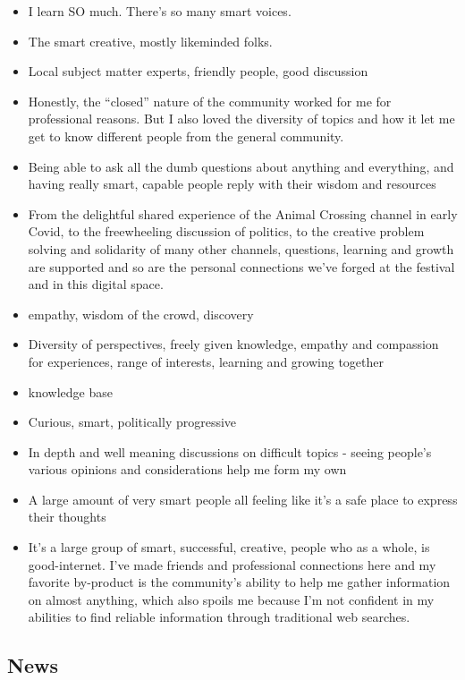 \documentclass[
]{book}
\providecommand{\tightlist}{%
  \setlength{\itemsep}{0pt}\setlength{\parskip}{0pt}}
\begin{document}
\begin{itemize}
\tightlist
\item
  I learn SO much. There's so many smart voices.
\item
  The smart creative, mostly likeminded folks.
\item
  Local subject matter experts, friendly people, good discussion
\item
  Honestly, the ``closed'' nature of the community worked for me for professional reasons. But I also loved the diversity of topics and how it let me get to know different people from the general community.
\item
  Being able to ask all the dumb questions about anything and everything, and having really smart, capable people reply with their wisdom and resources
\item
  From the delightful shared experience of the Animal Crossing channel in early Covid, to the freewheeling discussion of politics, to the creative problem solving and solidarity of many other channels, questions, learning and growth are supported and so are the personal connections we've forged at the festival and in this digital space.
\item
  empathy, wisdom of the crowd, discovery
\item
  Diversity of perspectives, freely given knowledge, empathy and compassion for experiences, range of interests, learning and growing together
\item
  knowledge base
\item
  Curious, smart, politically progressive
\item
  In depth and well meaning discussions on difficult topics - seeing people's various opinions and considerations help me form my own
\item
  A large amount of very smart people all feeling like it's a safe place to express their thoughts
\item
  It's a large group of smart, successful, creative, people who as a whole, is good-internet. I've made friends and professional connections here and my favorite by-product is the community's ability to help me gather information on almost anything, which also spoils me because I'm not confident in my abilities to find reliable information through traditional web searches.
\end{itemize}

\subsection{News}\label{news}
\end{document}
